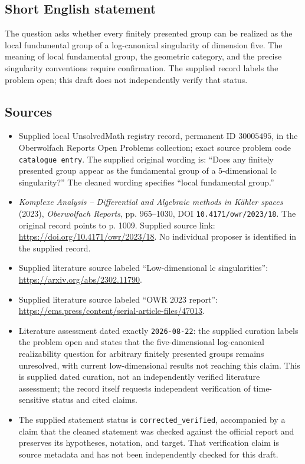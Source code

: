 \documentclass[11pt]{article}
\begin{document}
\subsection{Short English statement}
The question asks whether every finitely presented group can be realized as the local fundamental group of a log-canonical singularity of dimension five. The meaning of local fundamental group, the geometric category, and the precise singularity conventions require confirmation. The supplied record labels the problem open; this draft does not independently verify that status.
\subsection{Sources}
\begin{itemize}
\item Supplied local UnsolvedMath registry record, permanent ID \(30005495\), in the Oberwolfach Reports Open Problems collection; exact source problem code \texttt{catalogue entry}. The supplied original wording is: ``Does any finitely presented group appear as the fundamental group of a 5-dimensional lc singularity?'' The cleaned wording specifies ``local fundamental group.''
\item \emph{Komplexe Analysis -- Differential and Algebraic methods in Kähler spaces} (2023), \emph{Oberwolfach Reports}, pp. 965--1030, DOI \texttt{10.4171/owr/2023/18}. The original record points to p. 1009. Supplied source link: \url{https://doi.org/10.4171/owr/2023/18}. No individual proposer is identified in the supplied record.
\item Supplied literature source labeled ``Low-dimensional lc singularities'': \url{https://arxiv.org/abs/2302.11790}.
\item Supplied literature source labeled ``OWR 2023 report'': \url{https://ems.press/content/serial-article-files/47013}.
\item Literature assessment dated exactly \texttt{2026-08-22}: the supplied curation labels the problem open and states that the five-dimensional log-canonical realizability question for arbitrary finitely presented groups remains unresolved, with current low-dimensional results not reaching this claim. This is supplied dated curation, not an independently verified literature assessment; the record itself requests independent verification of time-sensitive status and cited claims.
\item The supplied statement status is \texttt{corrected\_verified}, accompanied by a claim that the cleaned statement was checked against the official report and preserves its hypotheses, notation, and target. That verification claim is source metadata and has not been independently checked for this draft.
\end{itemize}
\end{document}
